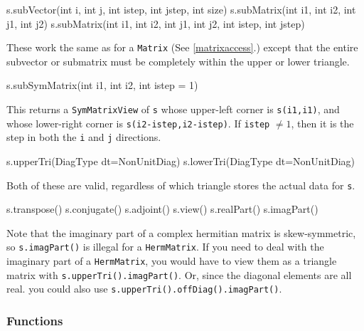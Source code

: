 \documentclass[twoside,letterpaper,11pt]{article}
\renewcommand{\tt}[1]{{\lstinline {#1}}}
\begin{document}
\begin{tmvcode}
s.subVector(int i, int j, int istep, int jstep, int size)
s.subMatrix(int i1, int i2, int j1, int j2)
s.subMatrix(int i1, int i2, int j1, int j2, int istep, int jstep)
\end{tmvcode}
These work the same as for a \tt{Matrix}
(See \ref{matrixaccess}.)
except that the entire
subvector or submatrix must be completely within the upper or lower triangle.

\begin{tmvcode}
s.subSymMatrix(int i1, int i2, int istep = 1)
\end{tmvcode}
This returns a \tt{SymMatrixView} of \tt{s} whose upper-left
corner is \tt{s(i1,i1)}, and whose lower-right corner is 
\tt{s(i2-istep,i2-istep)}.  If \tt{istep} $\neq 1$, then it is the 
step in both the \tt{i} and \tt{j} directions.

\begin{tmvcode}
s.upperTri(DiagType dt=NonUnitDiag)
s.lowerTri(DiagType dt=NonUnitDiag)
\end{tmvcode}
Both of these are valid, regardless
of which triangle stores the actual data for \tt{s}.
\begin{tmvcode}
s.transpose()
s.conjugate()
s.adjoint()
s.view()
s.realPart()
s.imagPart()
\end{tmvcode}
Note that the imaginary part of a complex hermitian matrix is skew-symmetric,
so \tt{s.imagPart()} is illegal for a \tt{HermMatrix}.  If you need to
deal with the imaginary part of a \tt{HermMatrix},
you would have to view them as a triangle matrix with \tt{s.upperTri().imagPart()}.  Or, 
since the diagonal elements are all real.
you could also use \tt{s.upperTri().offDiag().imagPart()}. 
\vspace{12pt}

\subsubsection{Functions}
\end{document}
